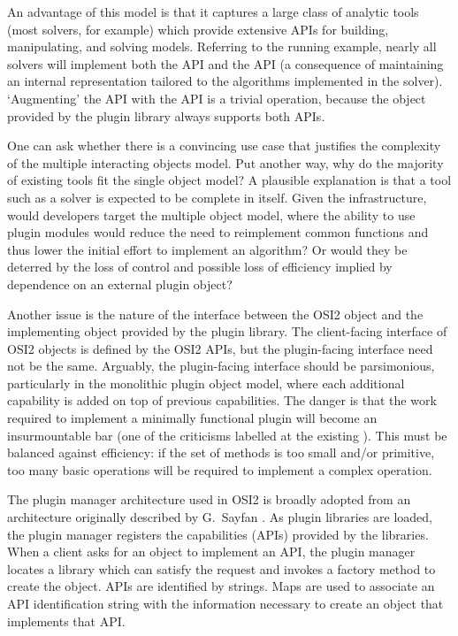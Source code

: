 \documentclass{article}
\newcommand{\OsiTwo}{OSI2\xspace}
\newcommand{\OsiTwoModel}{\pgmid{Osi2::ModelAPI}\xspace}
\newcommand{\OsiTwoSolve}{\pgmid{Osi2::SolveAPI}\xspace}
\begin{document}
\begin{itemize}
  An advantage of this model is that it captures a large class of analytic
  tools (most solvers, for example) which provide extensive APIs for
  building, manipulating, and solving models.
  Referring to the running example, nearly all solvers will implement both the
  \OsiTwoModel API and the \OsiTwoSolve API (a consequence of maintaining an
  internal representation tailored to the algorithms implemented in the solver).
  `Augmenting' the \OsiTwoModel API with the \OsiTwoSolve API is a
  trivial operation, because the object provided by the plugin library always
  supports both APIs.
\end{itemize}

One can ask whether there is a convincing use case that justifies the
complexity of the multiple interacting objects model.
Put another way, why do the majority of existing tools fit the single object
model\@?
A plausible explanation is that a tool such as a solver is expected to be 
complete in itself.
Given the infrastructure, would developers target the multiple object model,
where the ability to use plugin modules would reduce the need to reimplement
common functions and thus lower the initial effort to implement an
algorithm\@?
Or would they be deterred by the loss of control and possible loss of
efficiency implied by dependence on an external plugin object?

Another issue is the nature of the interface between the \OsiTwo object
and the implementing object provided by the plugin library.
The client-facing interface of \OsiTwo objects is defined by the \OsiTwo APIs,
but the plugin-facing interface need not be the same.
Arguably, the plugin-facing interface should be parsimonious, particularly in
the monolithic plugin object model, where each additional capability is
added on top of previous capabilities.
The danger is that the work required to implement a minimally functional
plugin will become an insurmountable bar (one of the criticisms labelled at
the existing ).
This must be balanced against efficiency: if the set of methods is too small
and/or primitive, too many basic operations will be required to implement a
complex operation.



The plugin manager architecture used in \OsiTwo is broadly adopted from an
architecture originally described by G.~Sayfan \cite{say07}.
As plugin libraries are loaded, the plugin manager registers the capabilities
(APIs) provided by the libraries.
When a client asks for an object to implement an API, the plugin manager
locates a library which can satisfy the request and invokes a factory method
to create the object.
APIs are identified by strings.
Maps are used to associate an API identification string with the information
necessary to create an object that implements that API.
\end{document}
